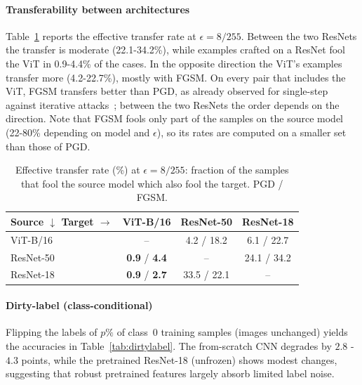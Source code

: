 \documentclass{article}
\begin{document}
\paragraph{Transferability between architectures}
Table~\ref{tab:transfer} reports the effective transfer rate at $\epsilon=8/255$. Between the two ResNets the transfer is moderate (22.1-34.2\%), while examples crafted on a ResNet fool the ViT in 0.9-4.4\% of the cases. In the opposite direction the ViT's examples transfer more (4.2-22.7\%), mostly with FGSM. On every pair that includes the ViT, FGSM transfers better than PGD, as already observed for single-step against iterative attacks~\cite{kurakin2017adversarialmachinelearningscale}; between the two ResNets the order depends on the direction. Note that FGSM fools only part of the samples on the source model (22-80\% depending on model and $\epsilon$), so its rates are computed on a smaller set than those of PGD.

\begin{table}[H]
  \caption{Effective transfer rate (\%) at $\epsilon=8/255$: fraction of the samples that fool the source model which also fool the target. PGD / FGSM.}
  \label{tab:transfer}
  \centering
  \begin{small}
    \begin{tabular}{lccc}
      \toprule
      Source $\downarrow$ Target $\rightarrow$ & ViT-B/16 & ResNet-50 & ResNet-18 \\
      \midrule
      ViT-B/16  & --            & 4.2 / 18.2  & 6.1 / 22.7 \\
      ResNet-50 & \textbf{0.9} / \textbf{4.4} & --          & 24.1 / 34.2 \\
      ResNet-18 & \textbf{0.9} / \textbf{2.7} & 33.5 / 22.1 & -- \\
      \bottomrule
    \end{tabular}
  \end{small}
  \vspace{-0.3cm}
\end{table}

\paragraph{Dirty-label (class-conditional)}
Flipping the labels of $p\%$ of class~0 training samples (images unchanged) yields the accuracies in Table~\ref{tab:dirtylabel}.
The from-scratch CNN degrades by $2.8$ - $4.3$ points, while the pretrained ResNet-18 (unfrozen) shows modest changes, suggesting that robust pretrained features largely absorb limited label noise.
\end{document}
